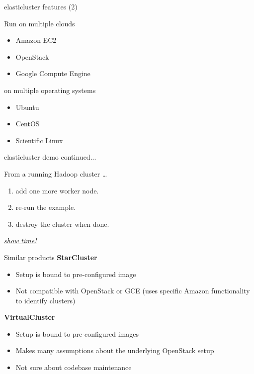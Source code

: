 \documentclass[english,serif,mathserif,usenames,dvipsnames]{beamer}
\begin{document}
\begin{frame}
  {elasticluster features (2)}

  \begin{block}{Run on multiple clouds}
  \begin{itemize}
  \item Amazon EC2
  \item OpenStack
  \item Google Compute Engine
  \end{itemize}
  \end{block}


  \begin{block}{on multiple operating systems}
    \begin{itemize}
    \item Ubuntu
    \item CentOS
    \item Scientific Linux
    \end{itemize}
  \end{block}
  
\end{frame}

\begin{frame}
  {elasticluster demo continued... }

  From a running Hadoop cluster \dots
  \begin{enumerate}
  \item add one more worker node.
  \item re-run the example.
  \item destroy the cluster when done.
  \end{enumerate}
  \pause
  \begin{center}
    \href{http://youtu.be/-Z4FaXEivVo\#t=2m12s}{\textit{show time!}}
  \end{center}
\end{frame}

\begin{frame}
  {Similar products}
  \textbf{StarCluster}
  \begin{itemize}
  \item Setup is bound to pre-configured image
  \item Not compatible with OpenStack or GCE (uses specific Amazon
    functionality to identify clusters)
  \end{itemize}

  \+

  \textbf{VirtualCluster}
  \begin{itemize}
  \item Setup is bound to pre-configured images
  \item Makes many assumptions about the underlying OpenStack setup
  \item Not sure about codebase maintenance
  \end{itemize}
\end{frame}
\end{document}
